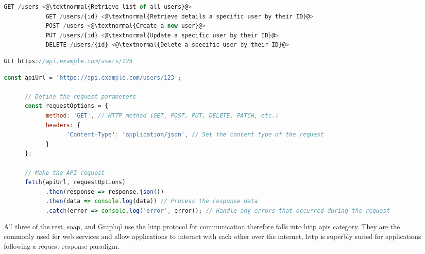 \begin{lstlisting}[language=JavaScript, caption=Different HTTP methods in REST]
            GET /users <@\textnormal{Retrieve list of all users}@>
            GET /users/{id} <@\textnormal{Retrieve details a specific user by their ID}@>
            POST /users <@\textnormal{Create a new user}@>
            PUT /users/{id} <@\textnormal{Update a specific user by their ID}@>
            DELETE /users/{id} <@\textnormal{Delete a specific user by their ID}@>
\end{lstlisting}
\begin{lstlisting}[language=JavaScript, caption=REST's Example Request]
            GET https://api.example.com/users/123
\end{lstlisting}
\begin{lstlisting}[language=JavaScript, caption=Example of REST request in JavaScript]
      const apiUrl = 'https://api.example.com/users/123';

      // Define the request parameters
      const requestOptions = {
            method: 'GET', // HTTP method (GET, POST, PUT, DELETE, PATCH, etc.)
            headers: {
                  'Content-Type': 'application/json', // Set the content type of the request
            }
      };

      // Make the API request
      fetch(apiUrl, requestOptions)
            .then(response => response.json())
            .then(data => console.log(data)) // Process the response data
            .catch(error => console.log('error', error)); // Handle any errors that occurred during the request
\end{lstlisting}
\begin{multicols}{2}
      All three of the \acrshort{rest}, \acrshort{soap}, and Graph\acrshort{ql} use the \acrshort{http} protocol for
      communication therefore falls into \acrshort{http} \acrshort{api}s category. They are the commonly used for web
      services  and allow applications to interact with each other over the internet. \acrshort{http} is superbly
      suited for applications following a request-response paradigm.
\end{multicols}

